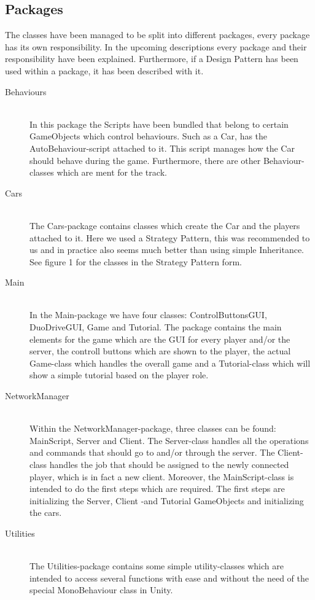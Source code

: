 \documentclass[11pt,twoside,a4paper]{article}
\begin{document}
\subsection{Packages}
The classes have been managed to be split into different packages, every package has its own responsibility. In the upcoming descriptions every package and their responsibility have been explained. Furthermore, if a Design Pattern has been used within a package, it has been described with it.
\begin{description}
\item[Behaviours] \hfill \\
    In this package the Scripts have been bundled that belong to certain GameObjects which control behaviours. Such as a Car, has the AutoBehaviour-script attached to it. This script manages how the Car should behave during the game. Furthermore, there are other Behaviour-classes which are ment for the track.
\item[Cars] \hfill \\
    The Cars-package contains classes which create the Car and the players attached to it. Here we used a Strategy Pattern, this was recommended to us and in practice also seems much better than using simple Inheritance. See figure 1 for the classes in the Strategy Pattern form.
\item[Main] \hfill \\
    In the Main-package we have four classes: ControlButtonsGUI, DuoDriveGUI, Game and Tutorial. The package contains the main elements for the game which are the GUI for every player and/or the server, the controll buttons which are shown to the player, the actual Game-class which handles the overall game and a Tutorial-class which will show a simple tutorial based on the player role.
\item[NetworkManager] \hfill \\
    Within the NetworkManager-package, three classes can be found: MainScript, Server and Client. The Server-class handles all the operations and commands that should go to and/or through the server. The Client-class handles the job that should be assigned to the newly connected player, which is in fact a new client. Moreover, the MainScript-class is intended to do the first steps which are required. The first steps are initializing the Server, Client -and Tutorial GameObjects and initializing the cars.
\item[Utilities] \hfill \\
    The Utilities-package contains some simple utility-classes which are intended to access several functions with ease and without the need of the special MonoBehaviour class in Unity.

\end{description}
\end{document}
